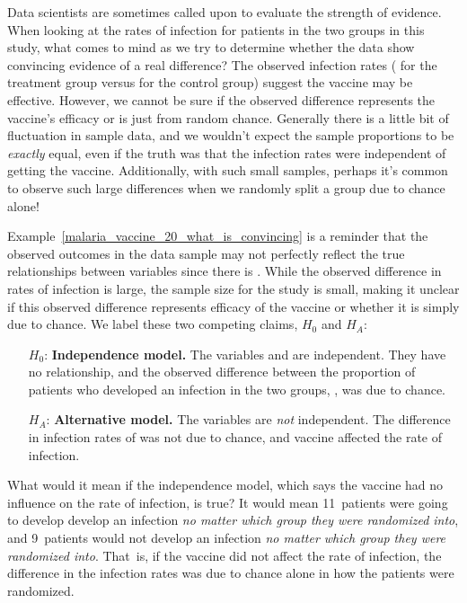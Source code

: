 \begin{example}{Data scientists are sometimes called
    upon to evaluate the strength of evidence.
    When looking at the rates of infection for patients
    in the two groups in this study,
    what comes to mind as we try to determine whether
    the data show convincing evidence of a real difference?}
  \label{malaria_vaccine_20_what_is_convincing}
  The observed infection rates
  (\malariaVIRPerc{} for the treatment group versus
  \malariaPIRPerc{} for the control group)
  suggest the vaccine may be effective.
  However, we cannot be sure if the observed difference
  represents the vaccine's efficacy or is just from
  random chance.
  Generally there is a little bit of fluctuation
  in sample data, and we wouldn't expect the sample
  proportions to be \emph{exactly} equal,
  even if the truth was that the infection rates
  were independent of getting the vaccine.
  Additionally, with such small samples,
  perhaps it's common to observe such large differences
  when we randomly split a group due to chance alone!
\end{example}

Example~\ref{malaria_vaccine_20_what_is_convincing}
is a reminder that the observed outcomes in the data
sample may not perfectly reflect the true relationships
between variables since there is .
While the observed difference in rates of infection
is large, the sample size for the study is small,
making it unclear if this observed difference represents
efficacy of the vaccine or whether it is simply due to
chance.
We label these two competing claims, $H_0$ and $H_A$:
\begin{itemize}
\setlength{\itemsep}{0mm}
\item[$H_0$:] \textbf{Independence model.}
    The variables  and 
    are independent.
    They have no relationship, and the observed difference
    between the proportion of patients who developed
    an infection in the two groups, \malariaIRDiffPerc{},
    was due to chance.
\item[$H_A$:] \textbf{Alternative model.}
    The variables are \emph{not} independent.
    The difference in infection rates of
    \malariaIRDiffPerc{}
    was not due to chance,
    and vaccine affected the rate of infection.
\end{itemize}

What would it mean if the independence model,
which says the vaccine had no influence on the
rate of infection, is true?
It would mean 11~patients were going to develop
develop an infection \emph{no matter which group
they were randomized into},
and 9~patients would not develop an infection
\emph{no matter which group they were randomized
into}.
That~is, if the vaccine did not affect the rate
of infection, the difference in the infection rates
was due to chance alone in how the patients were
randomized.

